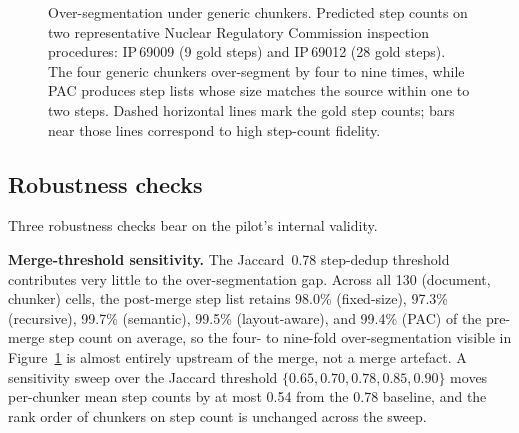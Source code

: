 \documentclass[fleqn,10pt]{wlscirep}
\begin{document}
\begin{figure}[ht]
\centering
{}
\caption{Over-segmentation under generic chunkers. Predicted step
counts on two representative Nuclear Regulatory Commission inspection
procedures: IP\,69009 (9 gold steps) and IP\,69012 (28 gold steps).
The four generic chunkers over-segment by four to nine times, while
PAC produces step lists whose size matches the source within one to
two steps. Dashed horizontal lines mark the gold step counts; bars
near those lines correspond to high step-count fidelity.}
\label{fig:overseg}
\end{figure}

\subsection*{Robustness checks}

Three robustness checks bear on the pilot's internal validity.

\textbf{Merge-threshold sensitivity.} The Jaccard~0.78 step-dedup
threshold contributes very little to the over-segmentation gap. Across
all 130 (document, chunker) cells, the post-merge step list retains
98.0\% (fixed-size), 97.3\% (recursive), 99.7\% (semantic), 99.5\%
(layout-aware), and 99.4\% (PAC) of the pre-merge step count on
average, so the four- to nine-fold over-segmentation visible in
Figure~\ref{fig:overseg} is almost entirely upstream of the merge,
not a merge artefact. A sensitivity sweep over the Jaccard threshold
$\{0.65,0.70,0.78,0.85,0.90\}$ moves per-chunker mean step counts by
at most 0.54 from the 0.78 baseline, and the rank order of chunkers
on step count is unchanged across the sweep.
\end{document}
